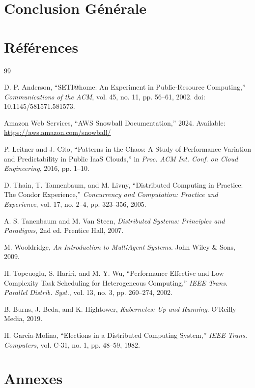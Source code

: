 \documentclass[12pt,a4paper]{report}
\theoremstyle{definition}
\begin{document}
\section*{Conclusion Générale}


\section*{Références}

\begin{thebibliography}{99}

D. P. Anderson,
``SETI@home: An Experiment in Public-Resource Computing,''
\textit{Communications of the ACM}, vol. 45, no. 11, pp. 56--61, 2002.
doi: 10.1145/581571.581573.

Amazon Web Services,
``AWS Snowball Documentation,''
2024. Available: \url{https://aws.amazon.com/snowball/}

P. Leitner and J. Cito,
``Patterns in the Chaos: A Study of Performance Variation and Predictability in Public IaaS Clouds,''
in \textit{Proc. ACM Int. Conf. on Cloud Engineering}, 2016, pp. 1--10.

D. Thain, T. Tannenbaum, and M. Livny,
``Distributed Computing in Practice: The Condor Experience,''
\textit{Concurrency and Computation: Practice and Experience}, vol. 17, no. 2--4, pp. 323--356, 2005.

A. S. Tanenbaum and M. Van Steen,
\textit{Distributed Systems: Principles and Paradigms}, 2nd ed.
Prentice Hall, 2007.

M. Wooldridge,
\textit{An Introduction to MultiAgent Systems}.
John Wiley \& Sons, 2009.

H. Topcuoglu, S. Hariri, and M.-Y. Wu,
``Performance-Effective and Low-Complexity Task Scheduling for Heterogeneous Computing,''
\textit{IEEE Trans. Parallel Distrib. Syst.}, vol. 13, no. 3, pp. 260--274, 2002.

B. Burns, J. Beda, and K. Hightower,
\textit{Kubernetes: Up and Running}.
O'Reilly Media, 2019.

H. Garcia-Molina,
``Elections in a Distributed Computing System,''
\textit{IEEE Trans. Computers}, vol. C-31, no. 1, pp. 48--59, 1982.

\end{thebibliography}
\section*{Annexes}
\end{document}
